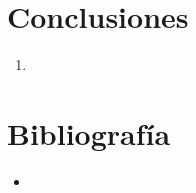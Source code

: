 \documentclass[12pt]{article}
\begin{document}
    \newpage
    \section{Conclusiones}

        \begin{enumerate}
            \item   
        \end{enumerate}
       

    \section{Bibliografía}
        \begin{itemize}
            \item 
        \end{itemize}
\end{document}
